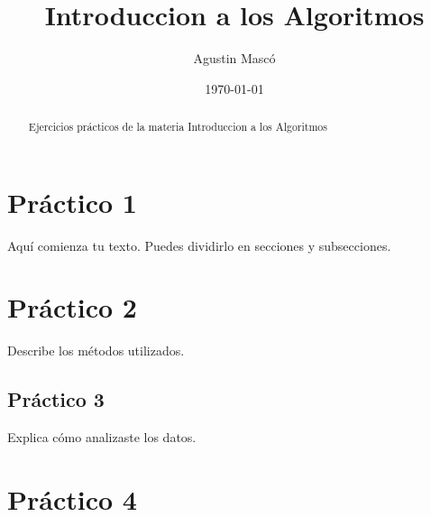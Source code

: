 \documentclass[12pt]{article} %
\title{Introduccion a los Algoritmos}
\author{Agustin Mascó}
\date{\today}
\begin{document}
\maketitle 


\begin{abstract}
Ejercicios prácticos de la materia Introduccion a los Algoritmos
\end{abstract}

\pagebreak

\section{Práctico 1}
Aquí comienza tu texto. Puedes dividirlo en secciones y subsecciones.

\section{Práctico 2}
Describe los métodos utilizados.

\subsection{Práctico 3}
Explica cómo analizaste los datos.

\section{Práctico 4}
\end{document}
